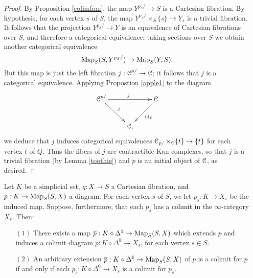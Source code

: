 \begin{proof}
By Proposition \ref{colimfam}, the map $Y^{p_S/} \rightarrow S$ is a Cartesian fibration. By hypothesis, for each vertex $s$ of $S$, the map $Y^{p_S/} \times_{S} \{s\}  \rightarrow  Y_s$
is a trivial fibration. It follows that the projection $Y^{p_S/} \rightarrow Y$ is an equivalence of Cartesian fibrations over $S$, and therefore a categorical equivalence; taking sections over $S$ we obtain another categorical equivalence
$$ \operatorname{{Map}}_{S}( S, Y^{p_S/} ) \rightarrow \operatorname{{Map}}_{S}(Y,S).$$
But this map is just the left fibration $j: \operatorname{\mathcal{C}}^{p/} \rightarrow \operatorname{\mathcal{C}}$; it follows that $j$ is a categorical equivalence. Applying Propostion \ref{apple1} to the diagram
$$ \xymatrix{ \calC^{p/} \ar[dr]^{j} \ar[rr]^{j} & & \calC \ar[dl]^{\id_{\calC}} \\
& \calC,}$$
we deduce that $j$ induces categorical equivalences $\operatorname{\mathcal{C}}_{p/} \times_{\operatorname{\mathcal{C}}} \{t\} \rightarrow \{t\}$ for each vertex $t$ of $Q$. Thus the fibers of $j$ are contractible Kan complexes, so that $j$ is a trivial fibration (by Lemma \ref{toothie}) and $p$ is an initial object of $\operatorname{\mathcal{C}}$, as desired.
\end{proof}

\begin{proposition}\label{limiteval}
Let $K$ be a simplicial set, $q: X \rightarrow S$ a Cartesian fibration, and
$p: K \rightarrow \operatorname{{Map}}_{S}(S,X)$ a diagram.
For each vertex $s$ of $S$, 
we let $p_s: K \rightarrow X_{s}$ be the induced map. Suppose,
furthermore, that each $p_s$ has a colimit in the $\infty$-category $X_{s}$. Then:

\begin{itemize}
\item[$(1)$] There exists a map $\overline{p}: K \diamond \Delta^0 \rightarrow \operatorname{{Map}}_{S}(S,X)$
which extends $p$ and induces a colimit diagram $\overline{p}: K \diamond
\Delta^0 \rightarrow X_{s}$, for each vertex $s \in S$.
                                                                                                                                                                                                                                                                                                                                                                                                                                                                                                       \item[$(2)$] An arbitrary extension $\overline{p}: K \diamond \Delta^0 \rightarrow \operatorname{{Map}}_{S}(S,X)$
of $p$ is a colimit for $p$ if and only if each $\overline{p}_s: K \diamond
\Delta^0 \rightarrow X_{s}$ is a colimit for $p_s$.
\end{itemize}
\end{proposition}

